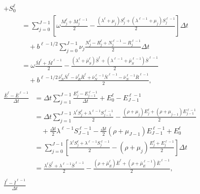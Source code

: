 \documentclass{jpmarticle}
\let\subequationsorig\subequations%
\let\endsubequationsorig\endsubequations%
\renewenvironment{subequations}{
  \subequationsorig
  \renewcommand{\theequation}{\theparentequation.\arabic{equation}}
}{
  \endsubequationsorig
}
\begin{document}
\begin{subequations}
\begin{align}
\begin{split}
      + S_0^{\ell}
      \\
      &= \sum_{j = 0}^{J - 1} \left[
        \omega \frac{M_j^{\ell} + M_j^{\ell - 1}}{2}
        - \frac{(\lambda^{\ell} + \mu_j) S_j^{\ell}
          + (\lambda^{\ell - 1} + \mu_j) S_j^{\ell - 1}}{2}
      \right] \Delta t
      \\ & \quad {}
      + b^{\ell - 1 / 2}
      \sum_{j = 0}^{J - 1}
      \nu_j
      \frac{N_j^{\ell} - R_j^{\ell} + N_j^{\ell - 1} - R_j^{\ell - 1}}{2}
      \Delta t
      \\
      &= \omega \frac{\bar{M}^{\ell} + \bar{M}^{\ell - 1}}{2}
      - \frac{(\lambda^{\ell} + \bar{\mu}_S^{\ell}) \bar{S}^{\ell}
        + (\lambda^{\ell - 1} + \bar{\mu}_S^{\ell - 1}) \bar{S}^{\ell - 1}}{2}
      \\ & \quad {}
      + b^{\ell - 1 / 2}
      \frac{\bar{\nu}_N^{\ell} \bar{N}^{\ell}
        - \bar{\nu}_R^{\ell} \bar{R}^{\ell}
        + \bar{\nu}_N^{\ell - 1} \bar{N}^{\ell - 1}
        - \bar{\nu}_N^{\ell - 1} \bar{R}^{\ell - 1}}{2},
    \end{split}
    \\
    \begin{split}
      \frac{\bar{E}^{\ell} - \bar{E}^{\ell - 1}}{\Delta t}
      &= \Delta t \sum_{j = 1}^{J - 1}
      \frac{E_j^{\ell} - E_{j - 1}^{\ell - 1}}{\Delta t}
      + E_0^{\ell} - E_{J - 1}^{\ell - 1}
      \\
      &= \Delta t \sum_{j = 1}^{J - 1}
      \frac{\lambda^{\ell} S_j^{\ell} + \lambda^{\ell - 1} S_{j - 1}^{\ell - 1}}{2}
      - \frac{(\rho + \mu_j) E_j^{\ell}
        + (\rho + \mu_{j - 1}) E_{j - 1}^{\ell - 1}}{2}
      \\ & \quad {}
      + \frac{\Delta t}{2}
      \lambda^{\ell - 1} S_{J - 1}^{\ell - 1}
      - \frac{\Delta t}{2} (\rho + \mu_{J - 1}) E_{J - 1}^{\ell - 1}
      + E_0^{\ell}
      \\
      &= \sum_{j = 0}^{J - 1} \left[
        \frac{\lambda^{\ell} S_j^{\ell} + \lambda^{\ell - 1} S_j^{\ell - 1}}{2}
        - (\rho + \mu_j) \frac{E_j^{\ell} + E_j^{\ell - 1}}{2}
      \right] \Delta t
      \\
      &= \frac{\lambda^{\ell} \bar{S}^{\ell}
        + \lambda^{\ell - 1} \bar{S}^{\ell - 1}}{2}
      - \frac{(\rho + \bar{\mu}_E^{\ell}) \bar{E}^{\ell}
        + (\rho + \bar{\mu}_E^{\ell - 1}) \bar{E}^{\ell - 1}}{2},
    \end{split}
    \\
    \begin{split}
      \frac{\bar{I}^{\ell} - \bar{I}^{\ell - 1}}{\Delta t}

\end{split}
\end{align}
\end{subequations}
\end{document}
